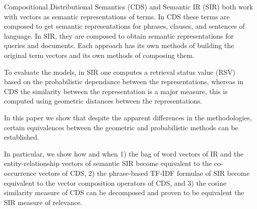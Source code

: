 Compositional Distributional Semantics (CDS) and Semantic IR (SIR)  both work with vectors as semantic representations of terms. In CDS  these terms are composed to get semantic representations for phrases, clauses, and sentences of language. In SIR, they are composed  to obtain semantic representations for queries and documents.  Each approach has its own methods of building the original term vectors and  its own methods of composing them.  


To evaluate the models, in SIR one  computes a retrieval status value (RSV) based on the  probabilistic dependance between the representations, whereas in CDS  the similarity between the representation is a major measure, this is  computed using    geometric distances between the representations.   
%


In this paper we show that despite the apparent differences in the methodologies,  certain equivalences between the geometric and probabilistic methods can be established. 


In particular, we show how and when  1) the bag of word vectors of IR and the entity-relationship vectors of semantic SIR become equivalent to the  co-occurrence vectors of CDS, 2) the  phrase-based TF-IDF  formulae of  SIR  become equivalent to the vector composition operators of CDS, and 3) the cosine similarity measure of CDS can be decomposed and proven to be equivalent  the SIR measure of relevance. 